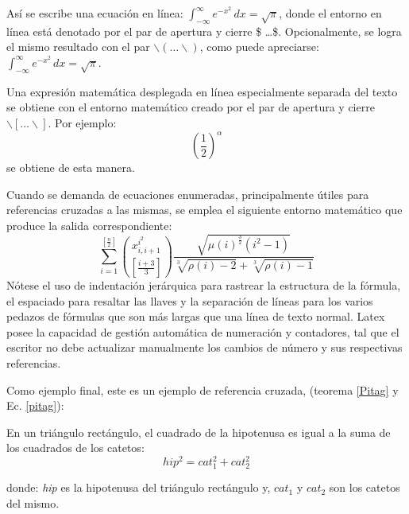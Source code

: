 Así se escribe una ecuación en línea: $\int_{-\infty}^{\infty} e^{-x^{2}} \, dx
= \sqrt{\pi}$, donde el entorno en línea está denotado por el par de apertura y cierre \$ \dots \$. Opcionalmente, se logra el mismo resultado con el par $ \backslash( \dots \backslash) $, como puede apreciarse: \( \int_{-\infty}^{\infty} e^{-x^{2}} \, dx
= \sqrt{\pi} \).

Una expresión matemática desplegada en línea especialmente separada del texto se obtiene con el entorno matemático creado por el par de apertura y cierre $ \backslash[ \dots \backslash] $. Por ejemplo: \[ \left( \frac{1}{2} \right)^{\alpha} \] se obtiene de esta manera.

Cuando se demanda de ecuaciones enumeradas, principalmente útiles para referencias cruzadas a las mismas, se emplea el siguiente entorno matemático que produce la salida correspondiente: \begin{equation}
\sum_{i = 1}^{ \left[ \frac{n}{2} \right] }
\binom{ x_{i, i + 1}^{i^{2}} }
{ \left[ \frac{i + 3}{3} \right] }
\frac{ \sqrt{ \mu(i)^{ \frac{3}{2}} (i^{2} - 1) } }
{\sqrt[3]{\rho(i)-2} + \sqrt[3]{\rho(i) - 1}}
\end{equation}
Nótese el uso de indentación jerárquica para rastrear la estructura de la fórmula, el espaciado para resaltar las llaves y la separación de líneas para los varios pedazos de fórmulas que son más largas que una línea de texto normal. Latex posee la capacidad de gestión automática de numeración y contadores, tal que el escritor no debe actualizar manualmente los cambios de número y sus respectivas referencias.

Como ejemplo final, este es un ejemplo de referencia cruzada, (teorema \ref{Pitag} y Ec. \ref{pitag}):

\begin{teorema}
En un triángulo rectángulo, el cuadrado de la hipotenusa es igual a la suma de los cuadrados de los catetos:
\begin{equation}
hip^2 = cat_1^2 + cat_2^2
\label{pitag}
\end{equation}
\label{Pitag}
\end{teorema}
donde: \textit{hip} es la hipotenusa del triángulo rectángulo y, $ cat_1 $ y $ cat_2 $ son los catetos del mismo.
